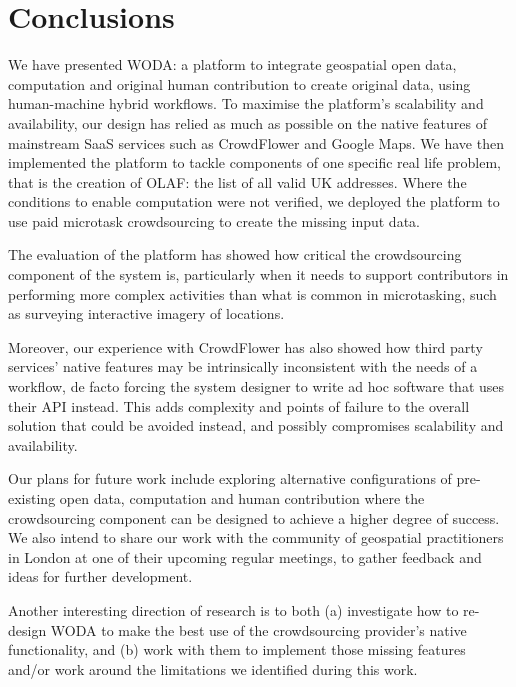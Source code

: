 \section{Conclusions}

We have presented WODA: a platform to integrate geospatial open data, computation and original human contribution to create original data, using human-machine hybrid workflows. To maximise the platform's scalability and availability, our design has relied as much as possible on the native features of mainstream SaaS services such as CrowdFlower and Google Maps. We have then implemented the platform to tackle components of one specific real life problem, that is the creation of OLAF: the list of all valid UK addresses. Where the conditions to enable computation were not verified, we deployed the platform to use paid microtask crowdsourcing to create the missing input data.

The evaluation of the platform has showed how critical the crowdsourcing component of the system is, particularly when it needs to support contributors in performing more complex activities than what is common in microtasking, such as surveying interactive imagery of locations. 

Moreover, our experience with CrowdFlower has also showed how third party services' native features may be intrinsically inconsistent with the needs of a workflow, de facto forcing the system designer to write ad hoc software that uses their API instead. This adds complexity and points of failure to the overall solution that could be avoided instead, and possibly compromises scalability and availability. 

Our plans for future work include exploring alternative configurations of pre-existing open data, computation and human contribution where the crowdsourcing component can be designed to achieve a higher degree of success. We also intend to share our work with the community of geospatial practitioners in London at one of their upcoming regular meetings, to gather feedback and ideas for further development.

Another interesting direction of research is to both (a) investigate how to re-design WODA to make the best use of the crowdsourcing provider's native functionality, and (b) work with them to implement those missing features and/or work around the limitations we identified during this work.
